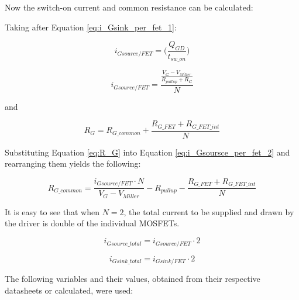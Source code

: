     Now the switch-on current and common resistance can be calculated:
    
    Taking after Equation \ref{eq:i_Gsink_per_fet_1}:

    \begin{equation}
        i_{Gsource/FET} = \bigg( \frac{Q_{GD}}{t_{sw{\_}on}} \bigg)
        \label{eq:i_Gsource_per_fet_1}
    \end{equation}    
    
    
    
    \begin{equation}
        i_{Gsource/FET} = \frac{\frac{V_G - V_{Miller}}{R_{pullup} + R_G}}{N}
        \label{eq:i_Gsoursce_per_fet_2}
    \end{equation}
    
    and
    
    \begin{equation}
        R_G = R_{G{\_}common} + \frac{R_{G{\_}FET} + R_{G{\_}FET{\_}int}}{N}
        \label{eq:R_G}
    \end{equation}
    
    Substituting Equation \ref{eq:R_G} into Equation \ref{eq:i_Gsoursce_per_fet_2} and rearranging them yields the following:
    
    \begin{equation}
        R_{G{\_}common} = \frac{i_{Gsource/FET} \cdot N}{V_G - V_{Miller}} - R_{pullup} - \frac{R_{G{\_}FET} + R_{G{\_}FET{\_}int}}{N}
        \label{eq:R_G_common}
    \end{equation}
    
    It is easy to see that when $N = 2$, the total current to be supplied and drawn by the driver is double of the individual MOSFETs.
    
    
    \begin{equation}
        i_{Gsource{\_}total} = i_{Gsource/FET} \cdot 2
        \label{eq:i_G_source_total}
    \end{equation}
    
    \begin{equation}
        i_{Gsink{\_}total} = i_{Gsink/FET} \cdot 2
        \label{eq:i_G_sink_total}
    \end{equation}
    
    The following variables and their values, obtained from their respective datasheets or calculated, were used:
    
